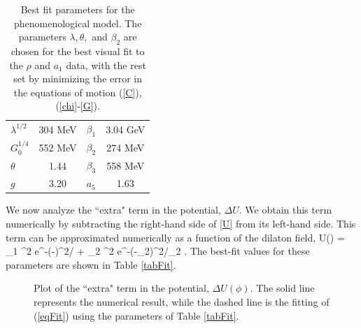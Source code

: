 \begin{table}[htb]
\begin{center}
\begin{tabular}{| l | c || c | c | }
\hline
  $\lambda^{1/2}$ & $304$ MeV & $\beta_1$ & 3.04 GeV  \\
  $G_0^{1/4}$ & 552 MeV & $\beta_2$ & 274 MeV \\
  $ \theta $& 1.44 & $\beta_3$ & 558 MeV \\
  $g $& 3.20 & $a_5$ & 1.63 \\
  \hline
\end{tabular}
\caption{Best fit parameters for the phenomenological model. 
The parameters $\lambda, \theta,$ and $ \beta_2$ are chosen for the best visual fit to the $\rho$ and $a_1$ data, with the rest set by minimizing the error in the equations of motion (\ref{C}), (\ref{chi}-\ref{G}). }
\label{tabParam}
\end{center}
\end{table}


We now analyze the ``extra" term in the potential, $\Delta U$. 
We obtain this term numerically by subtracting the right-hand side of \ref{U} from its left-hand side.
This term can be approximated numerically as a function of the dilaton field, 
\be
\Delta U\left(\Phi\right) = \alpha_1 \Phi^2 e^{-\left(\Phi-\right)^2/ } +   \alpha_2 \Phi^2 e^{-\left(\Phi-\gamma_2\right)^2/\delta_2 } .
\label{eqFit}
\ee
The best-fit values for these parameters are shown in Table \ref{tabFit}.

\begin{figure}[htb]
\caption{Plot of the ``extra" term in the potential, $\Delta U(\phi)$. The solid line represents the numerical result, while the dashed line is the fitting of (\ref{eqFit}) using the parameters of Table \ref{tabFit}.}
\label{figdeltaU}
\end{figure}

